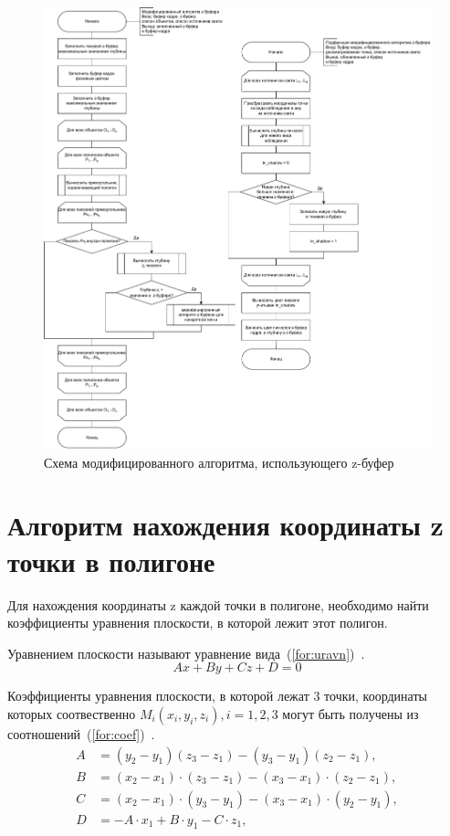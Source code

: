 \begin{figure}[h!]
	\centering
	\includegraphics[width=0.96\linewidth]{img/z_mod}
	\caption{Схема модифицированного алгоритма, использующего z-буфер}
	\label{fig:z_mod}
\end{figure}
\clearpage

\section[Алгоритм нахождения координаты z точки в полигоне]{Алгоритм нахождения координаты z\\точки в полигоне}

Для нахождения координаты z каждой точки в полигоне, необходимо найти коэффициенты уравнения плоскости, в которой лежит этот полигон.

Уравнением плоскости называют уравнение вида~(\ref{for:uravn})~\cite{angem}.
\begin{equation}
	\label{for:uravn}
	Ax + By + Cz + D = 0
\end{equation}

Коэффициенты уравнения плоскости, в которой лежат 3 точки, координаты которых соотвественно $M_i(x_i, y_i, z_i), i = 1, 2, 3$ могут быть получены из соотношений~(\ref{for:coef})~\cite{angem}.
\begin{equation}
\begin{align*}
	\label{for:coef}
	A &= (y_2 - y_1)(z_3 - z_1) - (y_3 - y_1)(z_2 - z_1), \\
	B &= (x_2 - x_1)\cdot(z_3 - z_1) - (x_3 - x_1)\cdot(z_2 - z_1), \\
	C &= (x_2 - x_1)\cdot(y_3 - y_1) - (x_3 - x_1)\cdot(y_2 - y_1), \\
	D &= -A \cdot x_1 + B \cdot y_1 - C \cdot z_1, \\
\end{align*}
\end{equation}

